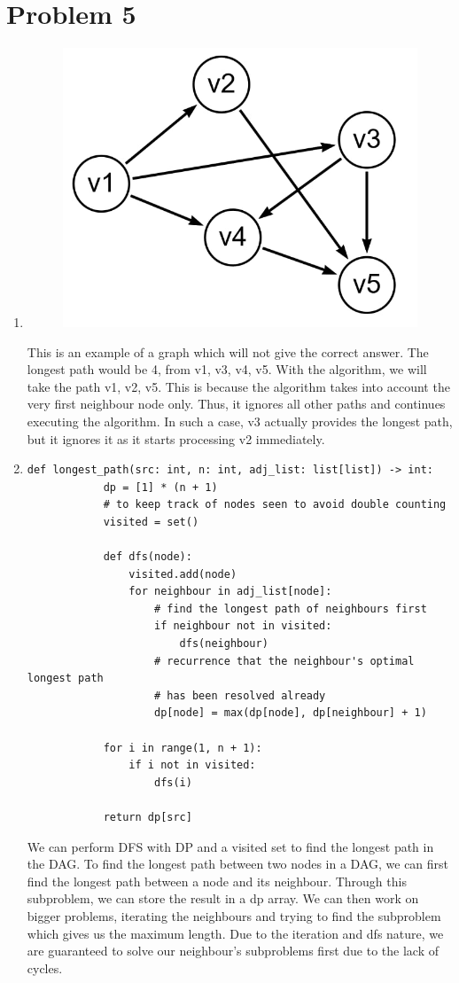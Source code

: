 \documentclass[12pt,letterpaper]{article}
\begin{document}
\section*{Problem 5}
  \begin{enumerate}
    \item
      \begin{figure}[!h]
      \centering
      \includegraphics[width=0.3\linewidth]{counterexamplegraph.jpg}
      \end{figure}
    This is an example of a graph which will not give the correct answer.
    The longest path would be 4, from v1, v3, v4, v5.
    With the algorithm, we will take the path v1, v2, v5.
    This is because the algorithm takes into account the very first neighbour node only.
    Thus, it ignores all other paths and continues executing the algorithm.
    In such a case, v3 actually provides the longest path, but it ignores it as it starts processing v2 immediately. 
    \item
    \begin{lstlisting}[style = Python]
        def longest_path(src: int, n: int, adj_list: list[list]) -> int:
            dp = [1] * (n + 1) 
            # to keep track of nodes seen to avoid double counting
            visited = set()
            
            def dfs(node):
                visited.add(node)
                for neighbour in adj_list[node]:
                    # find the longest path of neighbours first
                    if neighbour not in visited:
                        dfs(neighbour)
                    # recurrence that the neighbour's optimal longest path
                    # has been resolved already
                    dp[node] = max(dp[node], dp[neighbour] + 1)
            
            for i in range(1, n + 1):
                if i not in visited:
                    dfs(i)
            
            return dp[src]        
  \end{lstlisting}
    We can perform DFS with DP and a visited set to find the longest path in the DAG. 
    To find the longest path between two nodes in a DAG,
    we can first find the longest path between a node and its neighbour.
    Through this subproblem, we can store the result in a dp array.
    We can then work on bigger problems, iterating the neighbours
    and trying to find the subproblem which gives us the maximum length.
    Due to the iteration and dfs nature, we are guaranteed to solve our neighbour's subproblems first due to the lack of cycles. \\\\
    

\end{enumerate}
\end{document}
